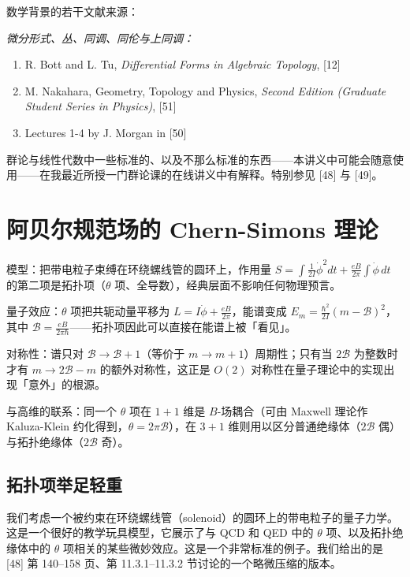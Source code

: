 数学背景的若干文献来源：

\emph{微分形式、丛、同调、同伦与上同调：}

\begin{enumerate}
  \item R. Bott and L. Tu, \emph{Differential Forms in Algebraic Topology}, [12]
  \item M. Nakahara, Geometry, Topology and Physics, \emph{Second Edition (Graduate Student Series in Physics)}, [51]
  \item Lectures 1-4 by J. Morgan in [50]
\end{enumerate}

群论与线性代数中一些标准的、以及不那么标准的东西——本讲义中可能会随意使用——在我最近所授一门群论课的在线讲义中有解释。特别参见 [48] 与 [49]。

\section{阿贝尔规范场的 Chern-Simons 理论} %

\begin{keytakeaways}
  \item 模型：把带电粒子束缚在环绕螺线管的圆环上，作用量 $S=\int\frac{1}{2I}\dot\phi^2dt+\frac{eB}{2\pi}\int\dot\phi\,dt$ 的第二项是拓扑项（$\theta$ 项、全导数），经典层面不影响任何物理预言。
  \item 量子效应：$\theta$ 项把共轭动量平移为 $L=I\dot\phi+\frac{eB}{2\pi}$，能谱变成 $E_m=\frac{\hbar^2}{2I}(m-\mathcal{B})^2$，其中 $\mathcal{B}=\frac{eB}{2\pi\hbar}$——拓扑项因此可以直接在能谱上被「看见」。
  \item 对称性：谱只对 $\mathcal{B}\to\mathcal{B}+1$（等价于 $m\to m+1$）周期性；只有当 $2\mathcal{B}$ 为整数时才有 $m\to2\mathcal{B}-m$ 的额外对称性，这正是 $O(2)$ 对称性在量子理论中的实现出现「意外」的根源。
  \item 与高维的联系：同一个 $\theta$ 项在 $1+1$ 维是 $B$-场耦合（可由 Maxwell 理论作 Kaluza-Klein 约化得到，$\theta=2\pi\mathcal{B}$），在 $3+1$ 维则用以区分普通绝缘体（$2\mathcal{B}$ 偶）与拓扑绝缘体（$2\mathcal{B}$ 奇）。
\end{keytakeaways}

\subsection{拓扑项举足轻重} %

我们考虑一个被约束在环绕螺线管（solenoid）的圆环上的带电粒子的量子力学。这是一个很好的教学玩具模型，它展示了与 QCD 和 QED 中的 $\theta$ 项、以及拓扑绝缘体中的 $\theta$ 项相关的某些微妙效应。这是一个非常标准的例子。我们给出的是 [48] 第 140--158 页、第 11.3.1--11.3.2 节讨论的一个略微压缩的版本。

